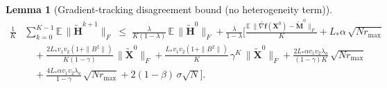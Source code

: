 \documentclass{article}
\newtheorem{lemma}{Lemma}
\begin{document}
\begin{lemma}[Gradient-tracking disagreement bound (no heterogeneity term)]
\begin{equation}
\label{eq:lem18-avg-tildeH-explicit}
\begin{split}
\frac{1}{K}&\sum_{k=0}^{K-1}\mathbb{E}\,\|\tilde{\mathbf H}^{k+1}\|_F
\;\le\;
\frac{\lambda}{K(1-\lambda)}\,\mathbb{E}\,\|\tilde{\mathbf H}^{0}\|_F
+\frac{\lambda}{1-\lambda}\Bigg[
\frac{\mathbb{E}\,\|\widetilde{\nabla \mathbf f}(\mathbf X^0)-\tilde{\mathbf M}^0\|_F}{K}
+L_*\alpha\,\sqrt{Nr_{\max}}
\\
&\quad+\frac{2L_*v_1v_2(1+\|B^2\|)}{K(1-\gamma)}\,\|\tilde{\mathbf X}^{0}\|_F
+\frac{L_*v_1v_2(1+\|B^2\|)}{K}\,\gamma^{K}\,\|\tilde{\mathbf X}^{0}\|_F
+\frac{2L_*\alpha v_1v_2\lambda_a}{(1-\gamma)K}\,\sqrt{Nr_{\max}}
\\
&\quad+\frac{4L_*\alpha v_1v_2\lambda_a}{1-\gamma}\,\sqrt{Nr_{\max}}
+2(1-\beta)\,\sigma\sqrt N\Bigg].
\end{split}
\end{equation}
\end{lemma}
\end{document}
